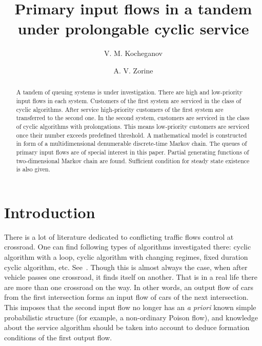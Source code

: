 \documentclass[60x84/16,10pt]{dccn}
\begin{document}
{


\title{Primary input flows in a tandem under prolongable cyclic service}

\author[1,2]{V. M. Kocheganov}
\author[1]{A. V. Zorine}

\address[1]{
N.I. Lobachevsky National Research\\  State University of Nizhny Novgorod\\
Gagarina av. 23, Nizhny Novgorod, 603950, Russia}
\address[2]{N.I. Lobachevsky National Research \\ State University of Nizhny Novgorod\\
Gagarina av. 23, Nizhny Novgorod, 603950, Russia}

\begin{abstract}
 A tandem of queuing systems is under investigation. There are high and low-priority input flows in each system. Customers of the first system are serviced in the class of cyclic algorithms. After service high-priority customers of the first system are transferred to the second one. In the second system, customers are serviced in the class of cyclic algorithms with prolongations. This means low-priority customers are serviced once their number exceeds predefined threshold. A mathematical model is constructed in form of a multidimensional denumerable discrete-time Markov chain. The queues of primary input flows are of special interest in this paper. Partial generating functions of two-dimensional Markov chain are found. Sufficient condition for steady state existence is also given.
\end{abstract}

{\sloppy
{}
}


\maketitle 

\section{Introduction}
\label{sec:intro}
There is a lot of literature dedicated to conflicting traffic flows control at crossroad. One can find following types of algorithms investigated there: cyclic algorithm with a loop, cyclic algorithm with changing regimes, fixed duration cyclic algorithm, etc. See~\cite{n:f:p:1968,f:1977,f:1977-1,l:f:2000,p:f:2008,a:b:2010}. Though this is almost always the case, when after vehicle passes one crossroad, it finds itself on another. That is in a real life there are more than one crossroad on the way. In other words, an output flow of cars from
the first intersection forms an input flow of cars of the next intersection. This imposes that the second input flow
no longer has an \textit{a priori} known simple probabilistic structure (for example, a
non-ordinary Poison flow), and knowledge about the service algorithm should be taken into account to deduce formation conditions of the first output flow.

}
\end{document}
